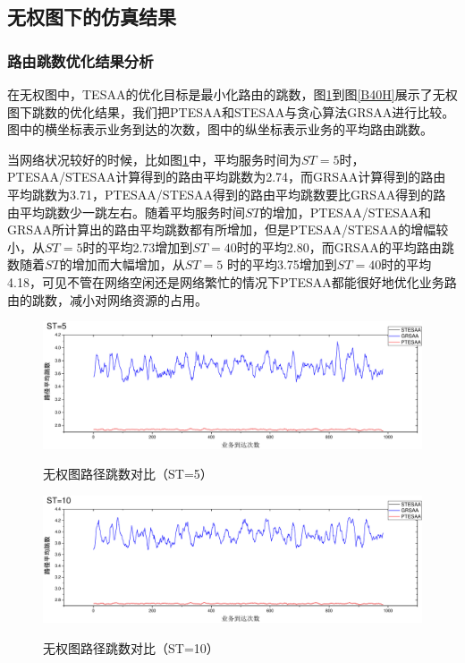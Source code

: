 \subsection{无权图下的仿真结果}
\subsubsection{路由跳数优化结果分析}

在无权图中，TESAA的优化目标是最小化路由的跳数，图\ref{B5H}到图\ref{B40H}展示了无权图下跳数的优化结果，我们把PTESAA和STESAA与贪心算法GRSAA进行比较。图中的横坐标表示业务到达的次数，图中的纵坐标表示业务的平均路由跳数。

当网络状况较好的时候，比如图\ref{B5H}中，平均服务时间为$ST=5$时，PTESAA/STESAA计算得到的路由平均跳数为2.74，而GRSAA计算得到的路由平均跳数为3.71，PTESAA/STESAA得到的路由平均跳数要比GRSAA得到的路由平均跳数少一跳左右。随着平均服务时间$ST$的增加，PTESAA/STESAA和GRSAA所计算出的路由平均跳数都有所增加，但是PTESAA/STESAA的增幅较小，从$ST=5$时的平均2.73增加到$ST=40$时的平均2.80，而GRSAA的平均路由跳数随着$ST$的增加而大幅增加，从$ST=5$ 时的平均3.75增加到$ST=40$时的平均4.18，可见不管在网络空闲还是网络繁忙的情况下PTESAA都能很好地优化业务路由的跳数，减小对网络资源的占用。
\begin{figure}
\setlength{\abovecaptionskip}{-0.5cm}
\begin{center}
{\includegraphics[width=1 \textwidth]{figures/B5H.pdf}}
\end{center}
\caption{{\footnotesize{无权图路径跳数对比（ST=5）}}}
\label{B5H}
\end{figure}
\begin{figure}
\vspace{-0.5cm}
\setlength{\abovecaptionskip}{-0.5cm}
\begin{center}
{\includegraphics[width=1 \textwidth]{figures/B10H.pdf}}
\end{center}
\caption{{\footnotesize{无权图路径跳数对比（ST=10）}}}
\label{B10H}
\end{figure}
